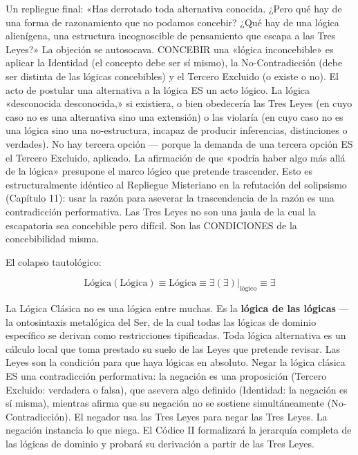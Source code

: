 \documentclass[10pt, openany, oneside]{book}
\begin{document}
\noindent Un repliegue final: «Has derrotado toda alternativa conocida. ¿Pero qué hay de una forma de razonamiento que no podamos concebir? ¿Qué hay de una lógica alienígena, una estructura incognoscible de pensamiento que escapa a las Tres Leyes?» La objeción se autosocava. CONCEBIR una «lógica inconcebible» es aplicar la Identidad (el concepto debe ser sí mismo), la No-Contradicción (debe ser distinta de las lógicas concebibles) y el Tercero Excluido (o existe o no). El acto de postular una alternativa a la lógica ES un acto lógico. La lógica «desconocida desconocida,» si existiera, o bien obedecería las Tres Leyes (en cuyo caso no es una alternativa sino una extensión) o las violaría (en cuyo caso no es una lógica sino una no-estructura, incapaz de producir inferencias, distinciones o verdades). No hay tercera opción --- porque la demanda de una tercera opción ES el Tercero Excluido, aplicado. La afirmación de que «podría haber algo más allá de la lógica» presupone el marco lógico que pretende trascender. Esto es estructuralmente idéntico al Repliegue Misteriano en la refutación del solipsismo (Capítulo 11): usar la razón para aseverar la trascendencia de la razón es una contradicción performativa. Las Tres Leyes no son una jaula de la cual la escapatoria sea concebible pero difícil. Son las CONDICIONES de la concebibilidad misma.

\noindent El colapso tautológico:

$$\text{Lógica}(\text{Lógica}) \equiv \text{Lógica} \equiv \exists(\exists)|_{\text{lógico}} \equiv \exists$$

La Lógica Clásica no es una lógica entre muchas. Es la \textbf{lógica de las lógicas} --- la ontosintaxis metalógica del Ser, de la cual todas las lógicas de dominio específico se derivan como restricciones tipificadas. Toda lógica alternativa es un cálculo local que toma prestado su suelo de las Leyes que pretende revisar. Las Leyes son la condición para que haya lógicas en absoluto. Negar la lógica clásica ES una contradicción performativa: la negación es una proposición (Tercero Excluido: verdadera o falsa), que asevera algo definido (Identidad: la negación es sí misma), mientras afirma que su negación no se sostiene simultáneamente (No-Contradicción). El negador usa las Tres Leyes para negar las Tres Leyes. La negación instancia lo que niega. El Códice II formalizará la jerarquía completa de las lógicas de dominio y probará su derivación a partir de las Tres Leyes.

\vspace{1.5em}
\end{document}
